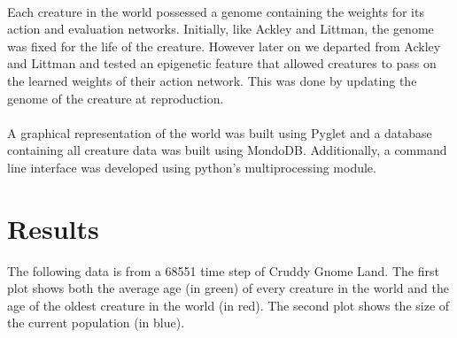 \documentclass[12pt]{report}
\begin{document}
\paragraph{} Each creature in the world possessed a genome containing the weights for its action and evaluation networks. Initially, like Ackley and Littman, the genome was fixed for the life of the creature. However later on we departed from Ackley and Littman and tested an epigenetic feature that allowed creatures to pass on the learned weights of their action network. This was done by updating the genome of the creature at reproduction.  
\paragraph{} A graphical representation of the world was built using Pyglet and a database containing all creature data was built using MondoDB. Additionally, a command line interface was developed using python's multiprocessing module.
\section*{Results}
The following data is from a 68551 time step of Cruddy Gnome Land. The first plot shows both the average age (in green) of every creature in the world and the age of the oldest creature in the world (in red). The second plot shows the size of the current population (in blue).

\begin{center}
\end{center}

\begin{center}
\end{center}
\end{document}
